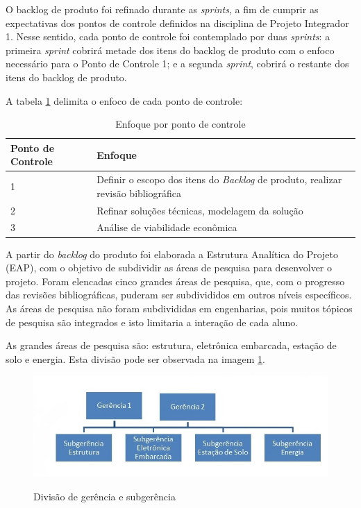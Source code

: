   O backlog de produto foi refinado durante as \emph{sprints}, a fim de cumprir as expectativas dos pontos de controle definidos na disciplina de Projeto Integrador 1. Nesse sentido, cada ponto de controle foi contemplado por duas \emph{sprints}: a primeira \emph{sprint} cobrirá metade dos itens do backlog de produto com o enfoco necessário para o Ponto de Controle 1; e a segunda \emph{sprint}, cobrirá o restante dos itens do backlog de produto.

  A tabela \ref{tab:enfoque_pc} delimita o enfoco de cada ponto de controle:

  \begin{table}[htp]
  \centering
  \caption{Enfoque por ponto de controle}
  \begin{tabular}{|p{4cm}|p{12cm}|}
  \hline
  Ponto de Controle & Enfoque                                                                                      \\ \hline
  1                 & Definir o escopo dos itens do \textit{Backlog} de produto, realizar revisão bibliográfica \\ \hline
  2                 & Refinar soluções técnicas, modelagem da solução                                              \\ \hline
  3                 & Análise de viabilidade econômica                                                             \\ \hline
  \end{tabular}
  \label{tab:enfoque_pc}
  \end{table}

	A partir do \emph{backlog} do produto foi elaborada a Estrutura Analítica do Projeto (EAP), com o objetivo de subdividir as áreas de pesquisa para desenvolver o projeto. Foram elencadas cinco grandes áreas de pesquisa, que, com o progresso das revisões bibliográficas, puderam ser subdivididos em outros níveis específicos. As áreas de pesquisa não foram subdivididas em engenharias, pois muitos tópicos de pesquisa são integrados e isto limitaria a interação de cada aluno.

	As grandes áreas de pesquisa são: estrutura, eletrônica embarcada, estação de solo e energia. Esta divisão pode ser observada na imagem \ref{img:sub-ori}.

	\begin{figure}[htp]
		\centering
		\caption{Divisão de gerência e subgerência}
		\includegraphics[width=\textwidth]{figuras/subgerencia-ori}
		\label{img:sub-ori}
	\end{figure}

